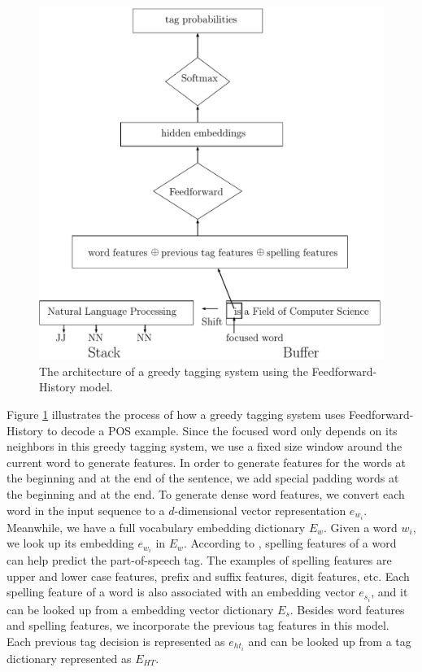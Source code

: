 \begin{figure}
  \centering
  \includegraphics[scale=0.6]{greedypos.pdf}
 \caption{The architecture of a greedy tagging system using the Feedforward-History model.}
  \label{fig:greedypos}
\end{figure}

Figure \ref{fig:greedypos} illustrates the process of how a greedy tagging system uses Feedforward-History to decode a POS example. Since the focused word only depends on its neighbors in this greedy tagging system, we use a fixed size window around the current word to generate features. In order to generate features for the words at the beginning and at the end of the sentence, we add special padding words at the beginning and at the end. To generate dense word features, we convert each word in the input sequence to a $d$-dimensional vector representation $e_{w_{i}}$. Meanwhile, we have a full vocabulary embedding dictionary $E_{w}$. Given a word $w_{i}$, we look up its embedding $e_{w_{i}}$ in $E_{w}$. According to \cite{ratnaparkhi1996maximum}, spelling features of a word can help predict the part-of-speech tag. The examples of spelling features are upper and lower case features, prefix and suffix features, digit features, etc. Each spelling feature of a word is also associated with an embedding vector $e_{s_{i}}$, and it can be looked up from a embedding vector dictionary $E_{s}$. Besides word features and spelling features, we incorporate the previous tag features in this model. Each previous tag decision is represented as $e_{ht_{i}}$ and can be looked up from a tag dictionary represented as $E_{HT}$.

